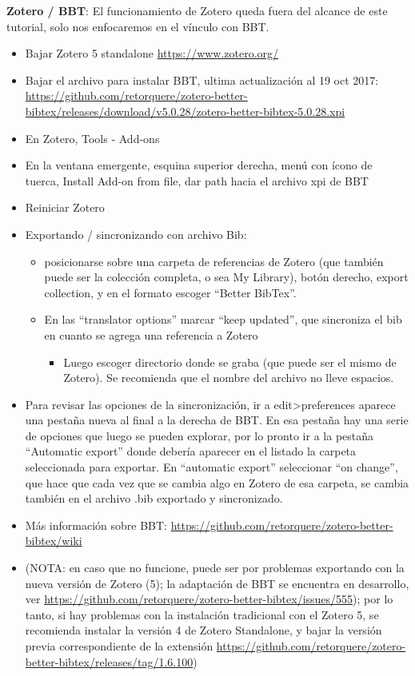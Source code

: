 \documentclass[
  11pt,
]{book}
\providecommand{\tightlist}{%
  \setlength{\itemsep}{0pt}\setlength{\parskip}{0pt}}
\begin{document}
\textbf{Zotero / BBT}: El funcionamiento de Zotero queda fuera del alcance de este tutorial, solo nos enfocaremos en el vínculo con BBT.

\begin{itemize}
\tightlist
\item
  Bajar Zotero 5 standalone \url{https://www.zotero.org/}
\item
  Bajar el archivo para instalar BBT, ultima actualización al 19 oct 2017: \url{https://github.com/retorquere/zotero-better-bibtex/releases/download/v5.0.28/zotero-better-bibtex-5.0.28.xpi}
\item
  En Zotero, Tools - Add-ons
\item
  En la ventana emergente, esquina superior derecha, menú con ícono de tuerca, Install Add-on from file, dar path hacia el archivo xpi de BBT
\item
  Reiniciar Zotero
\item
  Exportando / sincronizando con archivo Bib:

  \begin{itemize}
  \tightlist
  \item
    posicionarse sobre una carpeta de referencias de Zotero (que también puede ser la colección completa, o sea My Library), botón derecho, export collection, y en el formato escoger ``Better BibTex''.
  \item
    En las ``translator options'' marcar ``keep updated'', que sincroniza el bib en cuanto se agrega una referencia a Zotero

    \begin{itemize}
    \tightlist
    \item
      Luego escoger directorio donde se graba (que puede ser el mismo de Zotero). Se recomienda que el nombre del archivo no lleve espacios.
    \end{itemize}
  \end{itemize}
\item
  Para revisar las opciones de la sincronización, ir a edit\textgreater preferences aparece una pestaña nueva al final a la derecha de BBT. En esa pestaña hay una serie de opciones que luego se pueden explorar, por lo pronto ir a la pestaña ``Automatic export'' donde debería aparecer en el listado la carpeta seleccionada para exportar. En ``automatic export'' seleccionar ``on change'', que hace que cada vez que se cambia algo en Zotero de esa carpeta, se cambia también en el archivo .bib exportado y sincronizado.
\item
  Más información sobre BBT: \url{https://github.com/retorquere/zotero-better-bibtex/wiki}
\item
  (NOTA: en caso que no funcione, puede ser por problemas exportando con la nueva versión de Zotero (5); la adaptación de BBT se encuentra en desarrollo, ver \url{https://github.com/retorquere/zotero-better-bibtex/issues/555}); por lo tanto, si hay problemas con la instalación tradicional con el Zotero 5, se recomienda instalar la versión 4 de Zotero Standalone, y bajar la versión previa correspondiente de la extensión \url{https://github.com/retorquere/zotero-better-bibtex/releases/tag/1.6.100})
\end{itemize}
\end{document}

